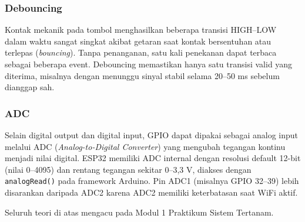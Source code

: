 \subsubsection{Debouncing}
Kontak mekanik pada tombol menghasilkan beberapa transisi HIGH--LOW dalam waktu sangat singkat akibat getaran saat kontak bersentuhan atau terlepas (\emph{bouncing}). Tanpa penanganan, satu kali penekanan dapat terbaca sebagai beberapa event. Debouncing memastikan hanya satu transisi valid yang diterima, misalnya dengan menunggu sinyal stabil selama 20--50 ms sebelum dianggap sah.

\subsubsection{ADC}
Selain digital output dan digital input, GPIO dapat dipakai sebagai analog input melalui ADC (\emph{Analog-to-Digital Converter}) yang mengubah tegangan kontinu menjadi nilai digital. ESP32 memiliki ADC internal dengan resolusi default 12-bit (nilai 0--4095) dan rentang tegangan sekitar 0--3,3 V, diakses dengan \texttt{analogRead()} pada framework Arduino. Pin ADC1 (misalnya GPIO 32--39) lebih disarankan daripada ADC2 karena ADC2 memiliki keterbatasan saat WiFi aktif.

Seluruh teori di atas mengacu pada Modul 1 Praktikum Sistem Tertanam.

